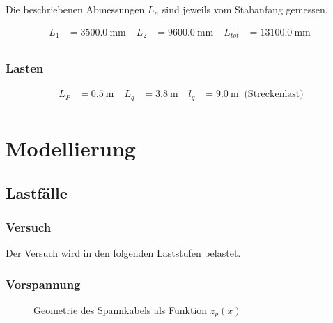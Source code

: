 \documentclass[
  11pt,
  letterpaper,
]{scrreprt}
\begin{document}
Die beschriebenen Abmessungen \(L_n\) sind jeweils vom Stabanfang
gemessen.

$$
\begin{aligned}
L_{1} &= 3500.0\ \mathrm{mm} \; 
 &L_{2} &= 9600.0\ \mathrm{mm} \; 
 &L_{tot} &= 13100.0\ \mathrm{mm} \; 
\\[10pt]
\end{aligned}
$$

\subsubsection{Lasten}\label{lasten}

$$
\begin{aligned}
L_{P} &= 0.5\ \mathrm{m} \; 
 &L_{q} &= 3.8\ \mathrm{m} \; 
 &l_{q} &= 9.0\ \mathrm{m} \; \;\textrm{(Streckenlast)}
\\[10pt]
\end{aligned}
$$

\section{Modellierung}\label{modellierung}

\subsection{Lastfälle}\label{lastfuxe4lle}

\subsubsection{Versuch}\label{versuch}

Der Versuch wird in den folgenden Laststufen belastet.

\subsubsection{Vorspannung}\label{vorspannung-1}

\begin{figure}[H]


\caption{\label{fig-z_p_von_x}Geometrie des Spannkabels als Funktion
\(z_p(x)\)}

\end{figure}%
\end{document}
